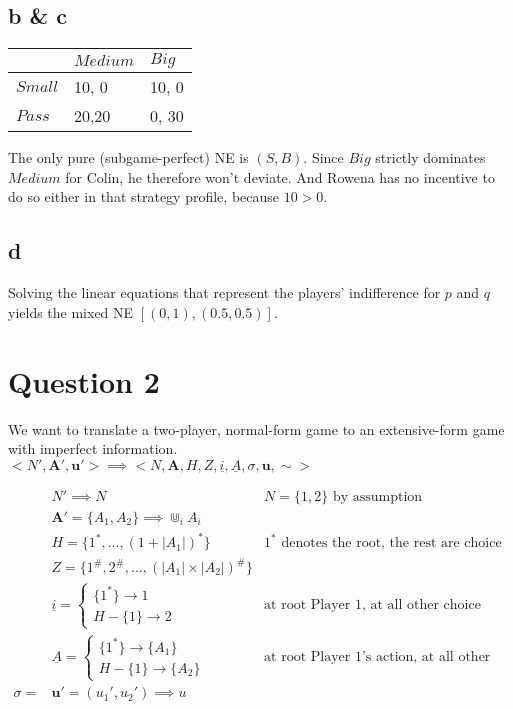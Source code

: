 \documentclass[10pt,a4paper]{article}
\begin{document}
\subsection*{b \& c}
\begin{table}[h]
\centering
\begin{tabular}[l]{|l|l|l|}
\hline
          & $Medium$ & $Big$  \\ \hline
$Small$     & 10, 0   & 10, 0 \\ \hline
$Pass$	& 20,20 & 0, 30 \\ \hline
\end{tabular}
\end{table}
The only pure (subgame-perfect) NE is $(S,B)$. Since $Big$ strictly dominates $Medium$ for Colin, he therefore won't deviate. And Rowena has no incentive to do so either in that strategy profile, because $10>0$.
\subsection*{d} 
Solving the linear equations that represent the players' indifference for $p$ and $q$ yields the mixed NE $[(0,1),(0.5,0.5)]$.
\section*{Question 2}
We want to translate a two-player, normal-form game to an extensive-form game with imperfect information.\\
$<N',\boldsymbol{A}',\boldsymbol{u}'> \implies <N,\boldsymbol{A}, H, Z, \underline{i},\underline{A},\sigma,\boldsymbol{u},\sim>$

\noindent \begin{align}
&N' \implies N & N=\{1,2\} \text{ by assumption}\\
&\boldsymbol{A}'=\{A_1,A_2\} \implies \Cup_i A_i &\text{} \\
&H=\{1^*,...,(1+|A_1|)^*\} &\text{$1^*$ denotes the root, the rest are choice nodes for Player 2} \\
&Z=\{1^{\#},2^{\#},...,(|A_1| \times |A_2|)^\# \}\\
&\underline{i}= \begin{cases}
\{1^*\} \rightarrow 1 \\
H-\{1\} \rightarrow 2 \end{cases} & \text{at root Player 1, at all other choice nodes Player 2}\\
&\underline{A}= \begin{cases}
\{1^*\}\rightarrow \{A_1\}  \\
H-\{1\} \rightarrow \{A_2\} \end{cases} & \text{at root Player 1's action, at all other choice nodes Player 2's}\\
\sigma = 
&\boldsymbol{u}'=(u_1',u_2') \implies u\\
\end{align}
\end{document}
